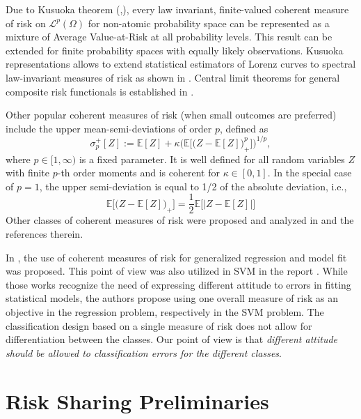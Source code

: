 \documentclass[10pt,letterpaper]{article}
\newcommand{\E}{\mathbb{E}}
\newcommand{\Lc}{\mathcal{L}}
\newcommand{\1}{1{\hskip -2.55 pt}\hbox{I}}
\begin{document}
Due to Kusuoka theorem (\cite{kusuoka2001law},\cite[Thm. 6.24]{shapiro2014lectures}), every law invariant, finite-valued
coherent measure of risk on $\Lc^{p}(\varOmega)$ for non-atomic probability space can be represented as a mixture of Average Value-at-Risk at all probability levels.
This result can be extended for finite probability spaces with equally likely observations.
Kusuoka representations allows to extend statistical estimators of Lorenz curves to spectral law-invariant measures of risk as shown in \cite{dentcheva2010shape}. Central limit theorems for general composite risk functionals is established in \cite{dentcheva2016statistical}.

Other popular coherent measures of risk (when small outcomes are preferred) include the upper mean-semi-deviations of order $p$, defined as
\begin{equation}
\label{ro-semi}
\sigma^+_p[Z] := \E[Z] + \kappa\Big( \E\Big[\big(Z-\E[Z]\big)_+^p\Big]\Big)^{1/p},
\end{equation}
where $p\in[1,\infty)$ is a fixed parameter. It is well defined for all random variables $Z$ with finite $p$-th order moments and is coherent for $\kappa\in [0,1]$.
In the special case of $p=1$, the upper semi-deviation is equal to 1/2 of the absolute deviation, i.e., 
\[
\E\Big[\big(Z-\E[Z]\big)_+\Big] = \frac{1}{2} \E\Big[\big|Z-\E[Z]\big|\Big]
\]
Other classes of coherent measures of risk were proposed and analyzed in \cite{cheridito2009risk,dentcheva2010kusuoka,krokhmal2007higher,ogryczak2002dual,shapiro2014lectures} and the references therein.

In \cite{rockafellar2008risk}, the use of coherent measures of risk for generalized regression and model fit was proposed.
This point of view was also utilized in SVM in the report \cite{gotoh2017support}.
While those works recognize the need of expressing different attitude to errors in fitting statistical models, the authors propose using one overall measure of risk as an objective in the regression problem, respectively in the SVM problem.
The classification design based on a single measure of risk does not allow for differentiation between the classes.
Our point of view is that \emph{different attitude should be allowed to classification errors for the different classes}.


\section{Risk Sharing Preliminaries} %
\label{sec:risk_sharing_preliminaries}
\end{document}

